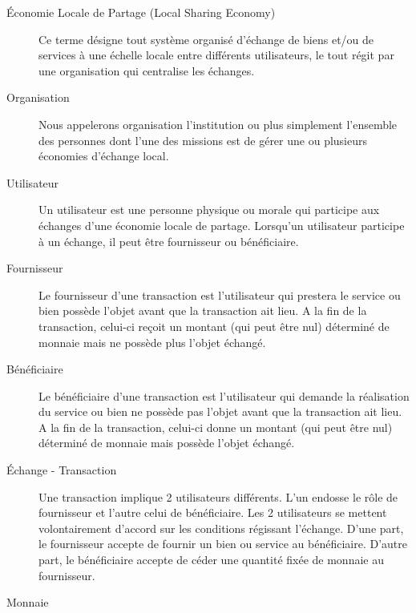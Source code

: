 \begin{description}

\item [Économie Locale de Partage (Local Sharing Economy)]
Ce terme désigne tout système organisé d'échange de biens et/ou de services à une échelle locale entre différents utilisateurs,  le tout régit par une organisation qui centralise les échanges.

\item [Organisation]
Nous appelerons organisation l'institution ou plus simplement l'ensemble des personnes dont l'une des missions est de gérer une ou plusieurs économies d'échange local.  

\item [Utilisateur]
Un utilisateur est une personne physique ou morale qui participe aux échanges d'une économie locale de partage.  Lorsqu'un utilisateur participe à un échange,  il peut être fournisseur ou bénéficiaire.  

\item [Fournisseur]

Le fournisseur d'une transaction est l'utilisateur qui prestera le service ou bien possède l'objet avant que la transaction ait lieu.  A la fin de la transaction,  celui-ci reçoit un montant (qui peut être nul) déterminé de monnaie mais ne possède plus l'objet échangé.

\item [Bénéficiaire]

Le bénéficiaire d'une transaction est l'utilisateur qui demande la réalisation du service ou bien ne possède pas l'objet avant que la transaction ait lieu.  A la fin de la transaction,  celui-ci donne un montant (qui peut être nul) déterminé de monnaie mais possède l'objet échangé.

\item [Échange - Transaction]

Une transaction implique 2 utilisateurs différents.  L'un endosse le rôle de fournisseur et l'autre celui de bénéficiaire.  Les 2 utilisateurs se mettent volontairement d'accord sur les conditions régissant l'échange.  D'une part,  le fournisseur accepte de fournir un bien ou service au bénéficiaire.  D'autre part,  le bénéficiaire accepte de céder une quantité fixée de monnaie au fournisseur.  

\item [Monnaie]
\label{dicoMonnaie}


\end{description}
